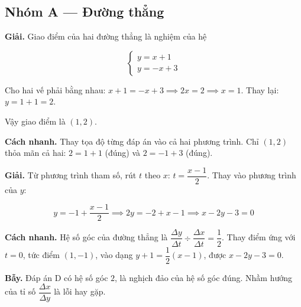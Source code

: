 \documentclass[11pt, a4paper]{article}
\begin{document}

\subsection*{Nhóm A — Đường thẳng}

\begin{dapan}[1 — Đáp án A]
\textbf{Giải.} Giao điểm của hai đường thẳng là nghiệm của hệ

$$\begin{cases} y = x + 1 \\ y = -x + 3 \end{cases}$$

Cho hai vế phải bằng nhau: $x + 1 = -x + 3 \implies 2x = 2 \implies x = 1$. Thay lại: $y = 1 + 1 = 2$.

Vậy giao điểm là $(1, 2)$.

\textbf{Cách nhanh.} Thay tọa độ từng đáp án vào cả hai phương trình. Chỉ $(1,2)$ thỏa mãn cả hai: $2 = 1 + 1$ (đúng) và $2 = -1 + 3$ (đúng).
\end{dapan}

\begin{dapan}[2 — Đáp án B]
\textbf{Giải.} Từ phương trình tham số, rút $t$ theo $x$: $t = \dfrac{x - 1}{2}$. Thay vào phương trình của $y$:

$$y = -1 + \frac{x-1}{2} \implies 2y = -2 + x - 1 \implies x - 2y - 3 = 0$$

\textbf{Cách nhanh.} Hệ số góc của đường thẳng là $\dfrac{\Delta y}{\Delta t} \div \dfrac{\Delta x}{\Delta t} = \dfrac{1}{2}$. Thay điểm ứng với $t = 0$, tức điểm $(1, -1)$, vào dạng $y + 1 = \dfrac{1}{2}(x-1)$, được $x - 2y - 3 = 0$.

\textbf{Bẫy.} Đáp án D có hệ số góc $2$, là nghịch đảo của hệ số góc đúng. Nhầm hướng của tỉ số $\dfrac{\Delta x}{\Delta y}$ là lỗi hay gặp.
\end{dapan}
\end{document}
